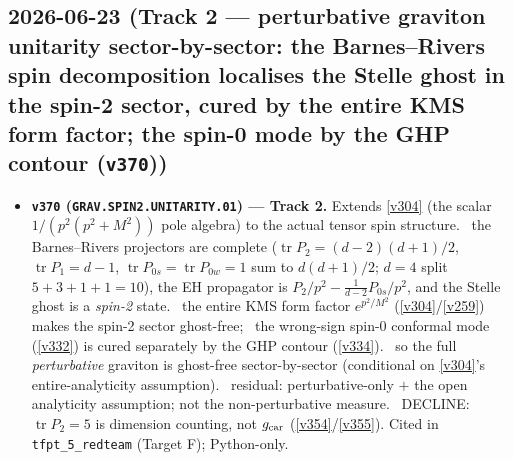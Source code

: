 \subsection*{2026-06-23 (Track 2 --- perturbative graviton unitarity sector-by-sector: the Barnes--Rivers spin decomposition localises the Stelle ghost in the spin-2 sector, cured by the entire KMS form factor; the spin-0 mode by the GHP contour (\texttt{v370}))}
\begin{itemize}
\item \textbf{\texttt{v370} (\texttt{GRAV.SPIN2.UNITARITY.01}) --- Track 2.} Extends \vref{v304} (the scalar
$1/(p^2(p^2{+}M^2))$ pole algebra) to the actual tensor spin structure. \mE\ the Barnes--Rivers projectors are
complete ($\operatorname{tr}P_2{=}(d{-}2)(d{+}1)/2$, $\operatorname{tr}P_1{=}d{-}1$,
$\operatorname{tr}P_{0s}{=}\operatorname{tr}P_{0w}{=}1$ sum to $d(d{+}1)/2$; $d{=}4$ split $5{+}3{+}1{+}1{=}10$),
the EH propagator is $P_2/p^2-\tfrac1{d-2}P_{0s}/p^2$, and the Stelle ghost is a \emph{spin-2} state. \mE\ the
entire KMS form factor $e^{p^2/M^2}$ (\vref{v304}/\vref{v259}) makes the spin-2 sector ghost-free; \mC\ the
wrong-sign spin-0 conformal mode (\vref{v332}) is cured separately by the GHP contour (\vref{v334}). \mC\ so the
full \emph{perturbative} graviton is ghost-free sector-by-sector (conditional on \vref{v304}'s entire-analyticity
assumption). \mO\ residual: perturbative-only $+$ the open analyticity assumption; not the non-perturbative
measure. \mO\ DECLINE: $\operatorname{tr}P_2{=}5$ is dimension counting, not $g_{\mathrm{car}}$ (\vref{v354}/\vref{v355}).
Cited in \texttt{tfpt\_5\_redteam} (Target F); Python-only.
\end{itemize}


